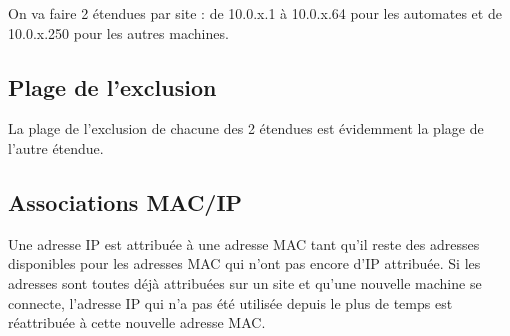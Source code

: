 On va faire 2 étendues par site : de 10.0.x.1 à 10.0.x.64 pour les automates et
de 10.0.x.250 pour les autres machines.

\subsection{Plage de l'exclusion}

La plage de l'exclusion de chacune des 2 étendues est évidemment la plage 
de l'autre étendue.

\subsection{Associations MAC/IP}

Une adresse IP est attribuée à une adresse MAC tant qu'il reste des adresses 
disponibles pour les adresses MAC qui n'ont pas encore d'IP attribuée.
Si les adresses sont toutes déjà attribuées sur un site et qu'une nouvelle 
machine se connecte, l'adresse IP qui n'a pas été utilisée depuis le plus 
de temps est réattribuée à cette nouvelle adresse MAC.


